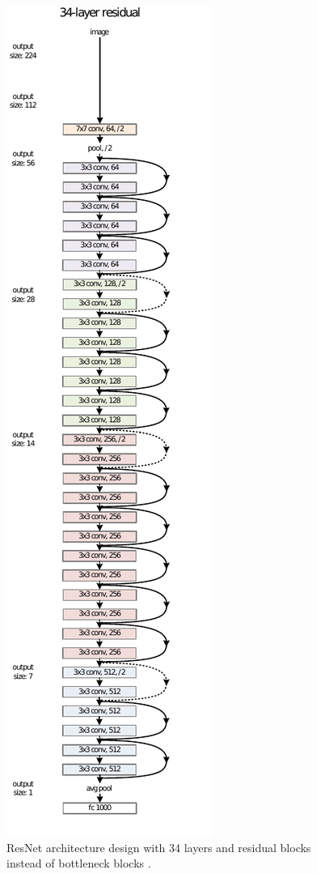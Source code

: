\begin{figure}
\centering
    \includegraphics{graphics/arch.pdf}
    \caption{ResNet architecture design with 34 layers and residual blocks instead of bottleneck blocks \citep{DBLP:conf/cvpr/HeZRS16}.}
    \label{fig:resnet34}
\end{figure}

